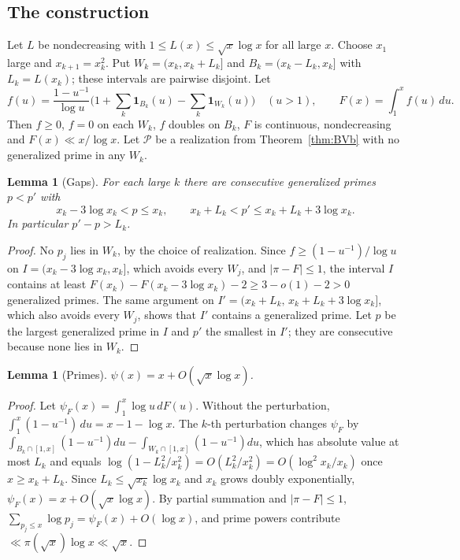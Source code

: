 \documentclass[11pt]{amsart}
\newtheorem{lemma}[theorem]{Lemma}
\theoremstyle{definition}
\theoremstyle{remark}
\begin{document}
\subsection{The construction}
Let $L$ be nondecreasing with $1\le L(x)\le\sqrt{x}\log x$ for all large $x$. Choose $x_1$ large and $x_{k+1}=x_k^2$. Put $W_k=(x_k,x_k+L_k]$ and $B_k=(x_k-L_k,x_k]$ with $L_k=L(x_k)$; these intervals are pairwise disjoint. Let
\[
f(u)=\frac{1-u^{-1}}{\log u}\Big(1+\sum_k \mathbf 1_{B_k}(u)-\sum_k\mathbf 1_{W_k}(u)\Big)\quad(u>1),\qquad F(x)=\int_1^x f(u)\,du .
\]
Then $f\ge0$, $f=0$ on each $W_k$, $f$ doubles on $B_k$, $F$ is continuous, nondecreasing and $F(x)\ll x/\log x$. Let $\mathcal P$ be a realization from Theorem~\ref{thm:BVb} with no generalized prime in any $W_k$.

\begin{lemma}[Gaps]\label{lem:bgap}
For each large $k$ there are consecutive generalized primes $p<p'$ with
\[
x_k-3\log x_k<p\le x_k,\qquad x_k+L_k<p'\le x_k+L_k+3\log x_k .
\]
In particular $p'-p>L_k$.
\end{lemma}
\begin{proof}
No $p_j$ lies in $W_k$, by the choice of realization. Since $f\ge (1-u^{-1})/\log u$ on $I=(x_k-3\log x_k,x_k]$, which avoids every $W_j$, and $|\pi-F|\le1$, the interval $I$ contains at least $F(x_k)-F(x_k-3\log x_k)-2\ge 3-o(1)-2>0$ generalized primes. The same argument on $I'=(x_k+L_k,\,x_k+L_k+3\log x_k]$, which also avoids every $W_j$, shows that $I'$ contains a generalized prime. Let $p$ be the largest generalized prime in $I$ and $p'$ the smallest in $I'$; they are consecutive because none lies in $W_k$.
\end{proof}

\begin{lemma}[Primes]\label{lem:bpsi}
$\psi(x)=x+O(\sqrt{x}\log x)$.
\end{lemma}
\begin{proof}
Let $\psi_F(x)=\int_1^x\log u\,dF(u)$. Without the perturbation, $\int_1^x(1-u^{-1})\,du=x-1-\log x$. The $k$-th perturbation changes $\psi_F$ by $\int_{B_k\cap[1,x]}(1-u^{-1})du-\int_{W_k\cap[1,x]}(1-u^{-1})du$, which has absolute value at most $L_k$ and equals $\log(1-L_k^2/x_k^2)=O(L_k^2/x_k^2)=O(\log^2x_k/x_k)$ once $x\ge x_k+L_k$. Since $L_k\le\sqrt{x_k}\log x_k$ and $x_k$ grows doubly exponentially, $\psi_F(x)=x+O(\sqrt x\log x)$. By partial summation and $|\pi-F|\le1$, $\sum_{p_j\le x}\log p_j=\psi_F(x)+O(\log x)$, and prime powers contribute $\ll\pi(\sqrt x)\log x\ll\sqrt x$.
\end{proof}
\end{document}
